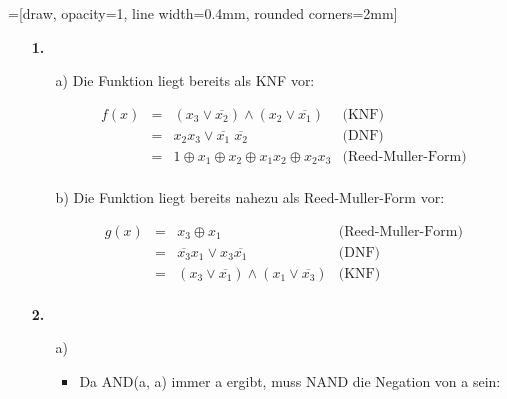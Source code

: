\documentclass[a4paper,10pt]{scrartcl}
\author{\authorinfo}
\title{\titleinfo}
\date{\today}
\begin{document}
\setcounter{secnumdepth}{0}
\maketitle

\setcounter{MaxMatrixCols}{31}


=[draw, opacity=1, line width=0.4mm, rounded corners=2mm]

\begin{enumerate}
    \item[\textbf{1.}]
    \begin{enumerate}
        \item[a)]
            Die Funktion liegt bereits als KNF vor:

            $$\begin{array}{rclr}
                f(x) &=& (x_3 \vee \overline{x_2}) \wedge (x_2 \vee \overline{x_1}) & \text{(KNF)}\\
                &=& x_2 x_3 \vee \overline{x_1}\;\overline{x_2} & \text{(DNF)}\\
                &=& 1 \oplus x_1 \oplus x_2 \oplus x_1x_2 \oplus x_2x_3 & \text{(Reed-Muller-Form)}\\
            \end{array}$$

        \item[b)]
            Die Funktion liegt bereits nahezu als Reed-Muller-Form vor:

            $$\begin{array}{rclr}
                g(x) &=& x_3 \oplus x_1 & \text{(Reed-Muller-Form)}\\
                &=& \overline{x_3}x_1 \vee x_3\overline{x_1} & \text{(DNF)}\\
                &=& (x_3 \vee \overline{x_1}) \wedge (x_1 \vee \overline{x_3}) & \text{(KNF)}\\
            \end{array}$$

    \end{enumerate}

    \item[\textbf{2.}]
    \begin{enumerate}
        \item[a)]
            \begin{itemize}
                \item
                    Da AND(a, a) immer a ergibt, muss NAND die Negation von a sein:


\end{itemize}
\end{enumerate}
\end{enumerate}
\end{document}
